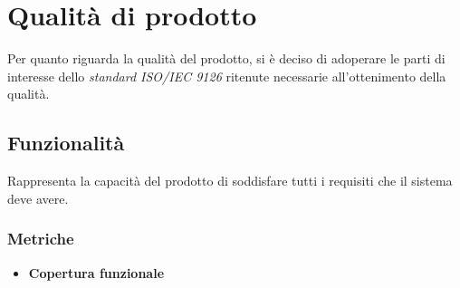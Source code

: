 \section{Qualità di prodotto}
Per quanto riguarda la qualità del prodotto, si è deciso di adoperare le parti di interesse dello \textit{standard ISO/IEC 9126\glos} ritenute necessarie all'ottenimento della qualità.
\subsection{Funzionalità}
Rappresenta la capacità del prodotto di soddisfare tutti i requisiti che il sistema deve avere.
\subsubsection{Metriche}
\begin{itemize}
	\item \textbf{Copertura funzionale}
\end{itemize}

